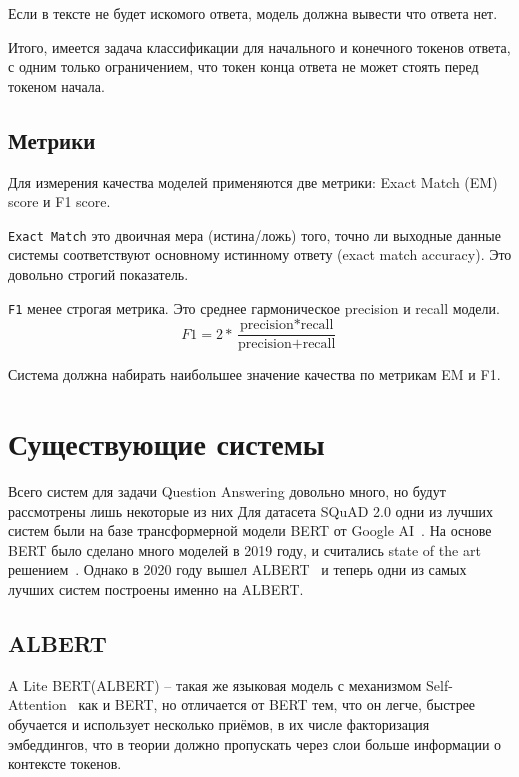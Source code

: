 \documentclass{article}
\begin{document}
Если в тексте не будет искомого ответа, модель должна вывести что ответа нет.

Итого, имеется задача классификации для начального и конечного токенов ответа, с одним только ограничением,
что токен конца ответа не может стоять перед токеном начала.

\subsection{Метрики}

Для измерения качества моделей применяются две метрики: Exact Match (EM) score и F1
score.

\texttt{Exact Match} это двоичная мера (истина/ложь) того, точно ли выходные данные системы соответствуют
основному истинному ответу (exact match accuracy). Это довольно строгий показатель.

\texttt{F1} менее строгая метрика. Это среднее гармоническое precision и recall модели. \\
$$F1 = 2*\frac{\text{precision}*\text{recall}}{\text{precision} + \text{recall}}$$

Система должна набирать наибольшее значение качества по метрикам EM и F1.

\section{Существующие системы}

Всего систем для задачи Question Answering довольно много, но будут рассмотрены лишь некоторые из них
Для датасета SQuAD 2.0 одни из лучших систем были на базе трансформерной модели 
BERT от Google AI~\cite{BERTPaper}. На основе BERT было сделано много моделей в 2019 году, и считались state of the art решением~\cite{BERTsquad}. Однако в 2020 году вышел ALBERT~\cite{ALBERT} и теперь одни из самых лучших систем построены именно на ALBERT.

\subsection{ALBERT}
A Lite BERT(ALBERT) -- такая же языковая модель с механизмом Self-Attention~\cite{Attention} как и BERT, но отличается от BERT тем, что он легче, быстрее обучается и использует несколько приёмов, в их числе факторизация эмбеддингов, что в теории должно пропускать через слои больше информации о контексте токенов.
\end{document}
